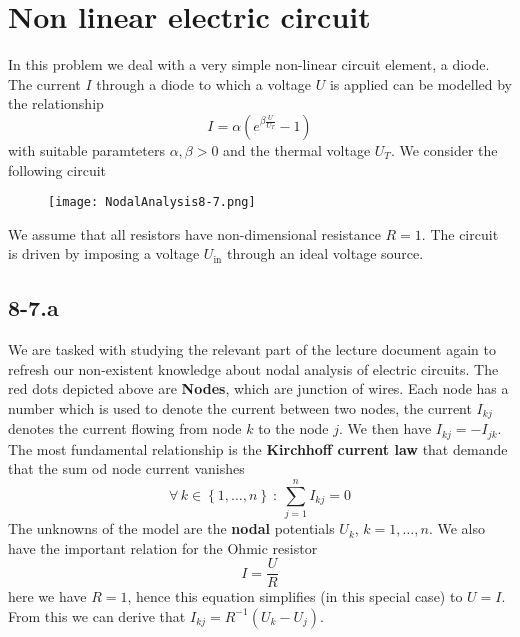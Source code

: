 \documentclass{article}
\begin{document}
\section*{Non linear electric circuit}
In this problem we deal with a very simple non-linear circuit element, a diode. The current $I$ through a diode to which a voltage $U$ is applied can be modelled by the relationship
\begin{equation*}
    I = \alpha\left(e^{\beta\frac{U}{U_{T}}}-1\right)
\end{equation*}
with suitable paramteters $\alpha, \beta > 0$ and the thermal voltage $U_{T}$. We consider the following circuit

\begin{figure}[!hbt]
    \centering
\texttt{[image: NodalAnalysis8-7.png]}
\end{figure}

We assume that all resistors have non-dimensional resistance $R=1$. The circuit is driven by imposing a voltage $U_{\text{in}}$ through an ideal voltage source.
\subsection*{8-7.a}
We are tasked with studying the relevant part of the lecture document again to refresh our non-existent knowledge about nodal analysis of electric circuits. The red dots depicted above are \textbf{Nodes}, which are junction of wires. Each node has a number which is used to denote the current between two nodes, the current $I_{kj}$ denotes the current flowing from node $k$ to the node $j$. We then have $I_{kj}=-I_{jk}$. The most fundamental relationship is the \textbf{Kirchhoff current law} that demande that the sum od node current vanishes
\begin{equation*}
    \forall \, k \in \left\{1, \dots, n\right\}\::\: \sum_{j=1}^{n}I_{kj} = 0
\end{equation*}
The unknowns of the model are the \textbf{nodal} potentials $U_{k}$, $k=1, \dots, n$. We also have the important relation for the Ohmic resistor
\begin{equation*}
    I = \frac{U}{R}
\end{equation*}
here we have $R=1$, hence this equation simplifies (in this special case) to $U = I$. From this we can derive that $I_{kj} = R^{-1}\left(U_{k} - U_{j}\right)$.
\end{document}
